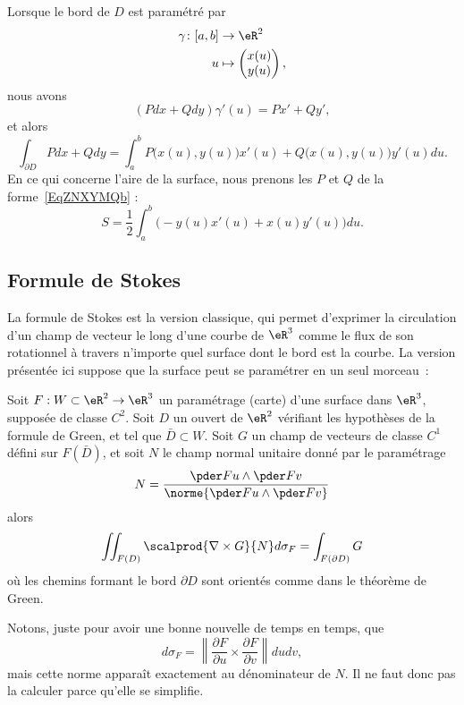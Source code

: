 Lorsque le bord de \( D\) est paramétré par
\begin{equation}
	\begin{aligned}
		\gamma\colon \mathopen[ a , b \mathclose] & \to \eR^2                            \\
		u                                         & \mapsto \begin{pmatrix}
			x(u) \\
			y(u)
		\end{pmatrix},
	\end{aligned}
\end{equation}
nous avons
\begin{equation}
	(Pdx+Qdy)\gamma'(u)=Px'+Qy',
\end{equation}
et alors
\begin{equation}
	\int_{\partial D}Pdx+Qdy=\int_a^b P\big( x(u),y(u) \big)x'(u)+Q\big( x(u),y(u) \big)y'(u)du.
\end{equation}
En ce qui concerne l'aire de la surface, nous prenons les \( P\) et \( Q\) de la forme~\ref{EqZNXYMQb} :
\begin{equation}    \label{EqAJGrtOk}
	S=\frac{ 1 }{2}\int_a^b\Big( -y(u)x'(u)+x(u)y'(u) \Big)du.
\end{equation}

\subsection{Formule de Stokes}
\label{secstokesusuel}

La formule de Stokes est la version classique, qui permet d'exprimer la circulation d'un champ de vecteur le long d'une courbe de \( \eR^3\) comme le flux de son rotationnel à travers n'importe quel surface dont le bord est la courbe. La version présentée ici suppose que la surface peut se paramétrer en un seul morceau~:
\begin{theorem}
	Soit \( F : W\subset \eR^2 \to \eR^3\) un paramétrage (carte) d'une surface dans \( \eR^3\), supposée de classe \( C^2\). Soit \( D\) un ouvert de \( \eR^2\) vérifiant les hypothèses de la formule de Green, et tel que \( \bar D \subset W\). Soit \( G\) un champ de vecteurs de classe \( C^1\) défini sur \( F(\bar D)\), et soit \( N\) le champ normal unitaire donné par le paramétrage
	\begin{equation}
		N = \frac{\pder F u \wedge \pder F v}{\norme{\pder F u \wedge \pder F v}}
	\end{equation}
	alors
	\begin{equation}\label{EqStokesTho}
		\iint_{F(D)} \scalprod{\nabla\times G}{N} d\sigma_F = \int_{F(\partial D)} G
	\end{equation}
	où les chemins formant le bord \( \partial D\) sont orientés comme dans le théorème de Green.
\end{theorem}
Notons, juste pour avoir une bonne nouvelle de temps en temps, que
\begin{equation}
	d\sigma_F=\left\| \frac{ \partial F }{ \partial u }\times\frac{ \partial F }{ \partial v }  \right\|dudv,
\end{equation}
mais cette norme apparaît exactement au dénominateur de \( N\). Il ne faut donc pas la calculer parce qu'elle se simplifie.

